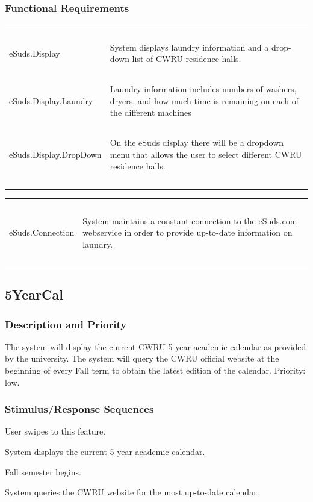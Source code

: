 \documentclass[pdftex,12pt,letter]{article}
\begin{document}
\subsubsection{Functional Requirements}
\begin{table}[!h]
\begin{tabularx}{\textwidth}[t]{|l Y|}
\hline
~&~\\
eSuds.Display & System displays laundry information and a drop-down list of CWRU residence halls.\\ 
~&~\\
eSuds.Display.Laundry & Laundry information includes numbers of washers, dryers, and how much time is remaining on each of the different machines \\
~&~\\
eSuds.Display.DropDown & On the eSuds display there will be a dropdown menu that allows the user to select different CWRU residence halls.\\
~&~\\
\hline
\end{tabularx}
\end{table}
\begin{table}[!h]
\begin{tabularx}{\textwidth}[t]{|l Y|}
\hline
~&~\\
eSuds.Connection & System maintains a constant connection to the eSuds.com webservice in order to provide up-to-date information on laundry.\\
~&~\\
\hline
\end{tabularx}
\end{table}
\FloatBarrier
\subsection{5YearCal}
\subsubsection{Description and Priority}
The system will display the current CWRU 5-year academic calendar as provided by the university. The system will query the CWRU official website at the beginning of every Fall term to obtain the latest edition of the calendar. Priority: low.
\subsubsection{Stimulus/Response Sequences}
\begin{description}\itemsep1pt
\item[Stimulus:] User swipes to this feature.
\item[Response:] System displays the current 5-year academic calendar.
\item[Stimulus:] Fall semester begins.
\item[Response:] System queries the CWRU website for the most up-to-date calendar.
\end{description}
\end{document}
